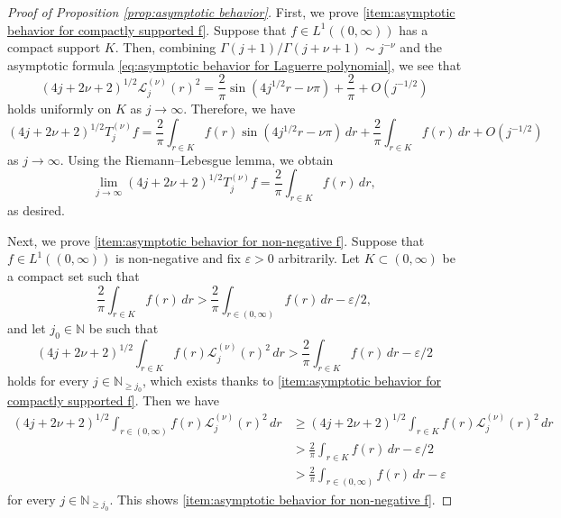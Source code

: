 \documentclass[10pt,a4paper]{amsart}
\newcommand{\LaguerrecalLjnu}[2]{\mathcal{L}_{#1}^{(#2)}}
\newcommand{\N}{\mathbb{N}}
\newcommand{\Tjnuf}[3]{T_{#1}^{(#2)}#3}
\newcommand{\intervaloo}[2]{(#1, #2)}
\begin{document}
\begin{proof}[Proof of Proposition \ref{prop:asymptotic behavior}]
	First, we prove \ref{item:asymptotic behavior for compactly supported f}. 
	Suppose that $f \in L^1(\intervaloo{0}{\infty})$ has a compact support $K$.
Then, combining $\Gamma(j+1)/\Gamma(j+\nu+1) \sim j^{-\nu}$ and the asymptotic formula \eqref{eq:asymptotic behavior for Laguerre polynomial}, we see that
	\begin{equation} \label{eq:asymptotic behavior for Laguerre function}
	(4j+2\nu+2)^{1/2} \LaguerrecalLjnu{j}{\nu}(r)^2 = \frac{2}{\pi} \sin{(4j^{1/2} r -\nu\pi)} + \frac{2}{\pi} + O(j^{-1/2})
\end{equation}
holds uniformly on $K$ as $j \to \infty$. Therefore, we have
\begin{equation}
(4j+2\nu+2)^{1/2} \Tjnuf{j}{\nu}{f} = \frac{2}{\pi} \int_{r \in K} f(r) \sin{(4j^{1/2} r -\nu\pi)} \, dr + \frac{2}{\pi} \int_{r \in K} f(r) \, dr + O(j^{-1/2})
\end{equation}
as $j \to \infty$.
Using the Riemann--Lebesgue lemma, we obtain
\begin{equation}
\lim_{j \to \infty} (4j+2\nu+2)^{1/2} \Tjnuf{j}{\nu}{f} = \frac{2}{\pi} \int_{r \in K} f(r) \, dr ,
\end{equation}
as desired. 

Next, we prove \ref{item:asymptotic behavior for non-negative f}. 
Suppose that $f \in L^1(\intervaloo{0}{\infty})$ is non-negative and
fix $\varepsilon > 0$ arbitrarily. 
Let $K \subset \intervaloo{0}{\infty}$ be a compact set such that
\begin{equation}
\frac{2}{\pi} \int_{r \in K} f(r) \, dr > \frac{2}{\pi} \int_{r \in \intervaloo{0}{\infty}} f(r) \, dr - \varepsilon / 2 ,
\end{equation}
and let $j_0 \in \N$ be such that 
\begin{equation}
(4j+2\nu+2)^{1/2} \int_{r \in K} f(r) \LaguerrecalLjnu{j}{\nu}(r)^2 \, dr > \frac{2}{\pi} \int_{r \in K} f(r) \, dr - \varepsilon / 2
\end{equation}
holds for every $j \in \N_{\geq j_0}$, which exists thanks to \ref{item:asymptotic behavior for compactly supported f}.
Then we have
\begin{align}
(4j+2\nu+2)^{1/2} \int_{r \in \intervaloo{0}{\infty}} f(r) \LaguerrecalLjnu{j}{\nu}(r)^2 \, dr
&\geq (4j+2\nu+2)^{1/2} \int_{r \in K} f(r) \LaguerrecalLjnu{j}{\nu}(r)^2 \, dr \\
&> \frac{2}{\pi} \int_{r \in K} f(r) \, dr - \varepsilon / 2  \\
&> \frac{2}{\pi} \int_{r \in \intervaloo{0}{\infty}} f(r) \, dr - \varepsilon
\end{align}
for every $j \in \N_{\geq j_0}$. This shows \ref{item:asymptotic behavior for non-negative f}.
\end{proof}
\end{document}
